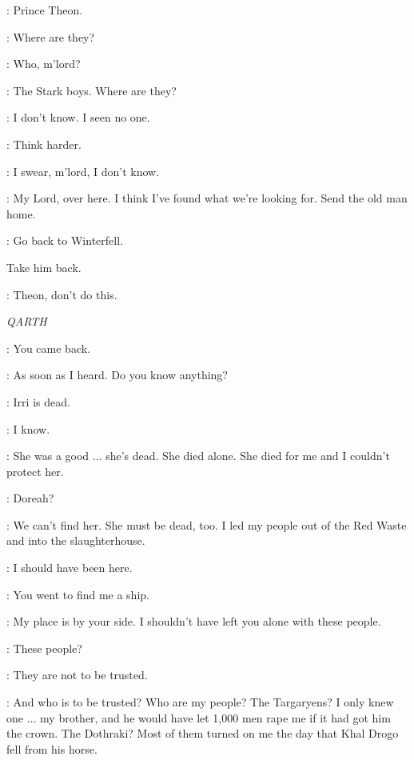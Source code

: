 
\DAGMER: Prince Theon.

\THEON: Where are they?

\FARMER: Who, m'lord?

\THEON: The Stark boys. Where are they?

\FARMER: I don't know. I seen no one.


\THEON: Think harder.

\FARMER: I swear, m'lord, I don't know.

\DAGMER: My Lord, over here. I think I've found what we're looking for. Send the old man home.


\THEON:  Go back to Winterfell.

 Take him back.

\LUWIN: Theon, don't do this.


\scene

\textit{QARTH}


\DAENERYS: You came back.

\JORAH: As soon as I heard. Do you know anything?


\DAENERYS: Irri is dead.

\JORAH: I know.

\DAENERYS: She was a good $\ldots$ she's dead. She died alone. She died for me and I couldn't protect her.

\JORAH: Doreah?

\DAENERYS: We can't find her. She must be dead, too. I led my people out of the Red Waste and into the slaughterhouse.

\JORAH: I should have been here.

\DAENERYS: You went to find me a ship.

\JORAH: My place is by your side. I shouldn't have left you alone with these people.

\DAENERYS: These people?

\JORAH: They are not to be trusted.

\DAENERYS: And who is to be trusted? Who are my people? The Targaryens? I only knew one $\ldots$ my brother, and he would have let 1,000 men rape me if it had got him the crown. The Dothraki? Most of them turned on me the day that Khal Drogo fell from his horse.

